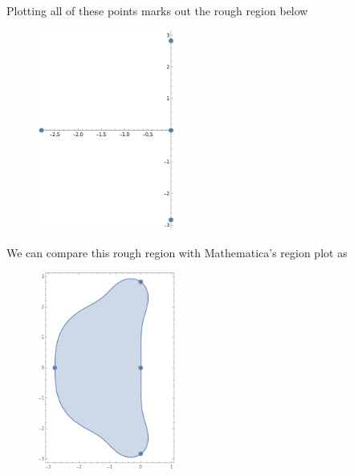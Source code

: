 \documentclass[a4paper,12pt]{article}
\begin{document}
\begin{enumerate}[label = (\arabic*)]
	\newpage
	Plotting all of these points marks out the rough region below
	\begin{figure}[h!]
		\centering
		\includegraphics[width = 0.4\textwidth]{Images/Dots.png}
	\end{figure}

	We can compare this rough region with Mathematica's region plot as
	\begin{figure}[h!]
		\centering
		\includegraphics[width = 0.4\textwidth]{Images/True.png}
	\end{figure}


\end{enumerate}
\end{document}
